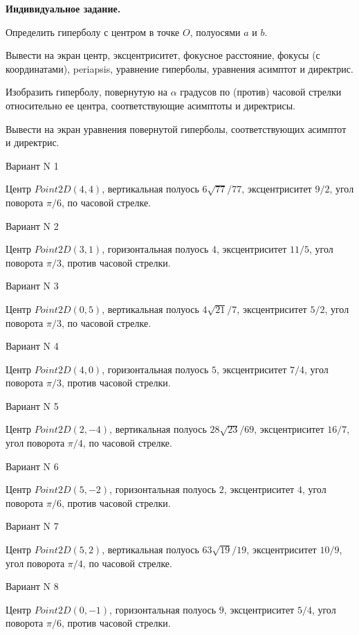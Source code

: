 \documentclass[11pt]{report}
\begin{document}
\pagestyle{empty}

{\bf Индивидуальное задание.}


Определить гиперболу с центром в точке $O$, полуосями $a$ и $b$.  


Вывести на экран центр, эксцентриситет, фокусное расстояние, фокусы (с координатами), periapsis, уравнение гиперболы, уравнения асимптот и директрис. 


Изобразить гиперболу, повернутую на $\alpha$ градусов по (против) часовой стрелки относительно ее центра, соответствующие асимптоты и директрисы. 


Вывести на экран уравнения повернутой гиперболы, соответствующих асимптот и директрис.

Вариант N 1

Центр $Point2D\left(4, 4\right)$, вертикальная полуось $6 \sqrt{77} / 77$, эксцентриситет $9 / 2$, угол поворота $\pi / 6$, по часовой стрелке.

Вариант N 2

Центр $Point2D\left(3, 1\right)$, горизонтальная полуось $4$, эксцентриситет $11 / 5$, угол поворота $\pi / 3$, против часовой стрелки.

Вариант N 3

Центр $Point2D\left(0, 5\right)$, вертикальная полуось $4 \sqrt{21} / 7$, эксцентриситет $5 / 2$, угол поворота $\pi / 3$, по часовой стрелке.

Вариант N 4

Центр $Point2D\left(4, 0\right)$, горизонтальная полуось $5$, эксцентриситет $7 / 4$, угол поворота $\pi / 3$, против часовой стрелки.

Вариант N 5

Центр $Point2D\left(2, -4\right)$, вертикальная полуось $28 \sqrt{23} / 69$, эксцентриситет $16 / 7$, угол поворота $\pi / 4$, по часовой стрелке.

Вариант N 6

Центр $Point2D\left(5, -2\right)$, горизонтальная полуось $2$, эксцентриситет $4$, угол поворота $\pi / 6$, против часовой стрелки.

Вариант N 7

Центр $Point2D\left(5, 2\right)$, вертикальная полуось $63 \sqrt{19} / 19$, эксцентриситет $10 / 9$, угол поворота $\pi / 4$, по часовой стрелке.

Вариант N 8

Центр $Point2D\left(0, -1\right)$, горизонтальная полуось $9$, эксцентриситет $5 / 4$, угол поворота $\pi / 6$, против часовой стрелки.
\end{document}
